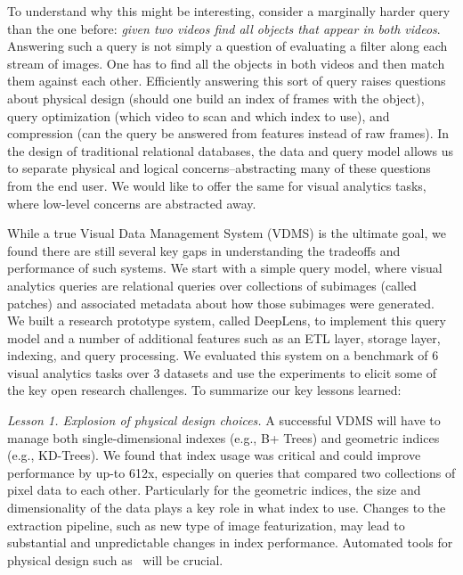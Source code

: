 To understand why this might be interesting, consider a marginally harder query than the one before: \emph{given two videos find all objects that appear in both videos}.
Answering such a query is not simply a question of evaluating a filter along each stream of images.
One has to find all the objects in both videos and then match them against each other.
Efficiently answering this sort of query raises questions about physical design (should one build an index of frames with the object), query optimization (which video to scan and which index to use), and compression (can the query be answered from features instead of raw frames).
In the design of traditional relational databases, the data and query model allows us to separate physical and logical concerns--abstracting many of these questions from the end user.
We would like to offer the same for visual analytics tasks, where low-level concerns are abstracted away. 

While a true Visual Data Management System (VDMS) is the ultimate goal, we found there are still several key gaps in understanding the tradeoffs and performance of such systems. 
We start with a simple query model, where visual analytics queries are relational queries over collections of subimages (called patches) and associated metadata about how those subimages were generated.
We built a research prototype system, called \textsf{DeepLens}, to implement this query model and a number of additional features such as an ETL layer, storage layer, indexing, and query processing. 
We evaluated this system on a benchmark of 6 visual analytics tasks over 3 datasets and use the experiments to elicit some of the key open research challenges.
To summarize our key lessons learned:

\vspace{0.75em} \noindent \emph{Lesson 1. Explosion of physical design choices. } A successful VDMS will have to manage both single-dimensional indexes (e.g., B+ Trees) and geometric indices (e.g., KD-Trees). We found that index usage was critical and could improve performance by up-to 612x, especially on queries that compared two collections of pixel data to each other.
Particularly for the geometric indices, the size and dimensionality of the data plays a key role in what index to use. Changes to the extraction pipeline, such as new type of image featurization, may lead to substantial and unpredictable changes in index performance.
Automated tools for physical design such as~\cite{sharma2018case,pavlo2017self} will be crucial.

